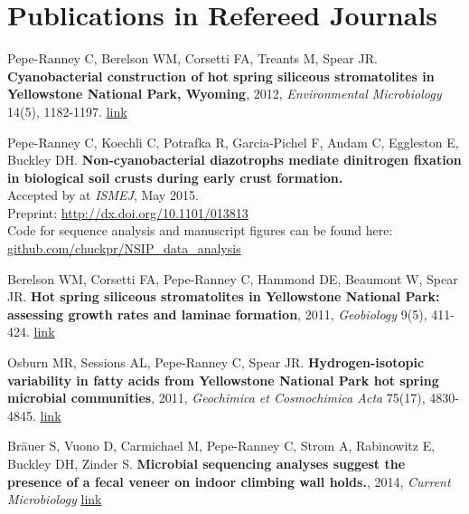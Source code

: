 \documentclass[letterpaper]{article}
\renewenvironment{itemize}{
  \begin{list}{}{
    \setlength{\leftmargin}{1.5em}
  }
}{
  \end{list}
}
\begin{document}
\section*{Publications in Refereed Journals}
\begin{itemize}
\item Pepe-Ranney C, Berelson WM, Corsetti FA, Treants M, Spear JR.
    \textbf{Cyanobacterial construction of hot spring siliceous stromatolites in
    Yellowstone National Park, Wyoming}, 2012, {\it Environmental
    Microbiology} 14(5), 1182-1197. \href{http://www.ncbi.nlm.nih.gov/pubmed/22356555}{link} 
\item Pepe-Ranney C, Koechli C, Potrafka R, Garcia-Pichel F, Andam C, Eggleston E, Buckley DH. 
    \textbf{Non-cyanobacterial diazotrophs mediate dinitrogen fixation in
    biological soil crusts during early crust formation.}\\ 
    Accepted by at \textit{ISMEJ}, May 2015.\\ 
    Preprint: \href{http://dx.doi.org/10.1101/013813}
    {http://dx.doi.org/10.1101/013813}\\
    Code for sequence analysis and manuscript figures can be found here:\\
    \href{http://www.github.com/chuckpr/NSIP_data_analysis}
    {github.com/chuckpr/NSIP\_data\_analysis}
\item Berelson WM, Corsetti FA, Pepe-Ranney C, Hammond DE, Beaumont W, Spear
    JR. \textbf{Hot spring siliceous stromatolites in Yellowstone National Park:
    assessing growth rates and laminae formation}, 2011, {\it Geobiology}
    9(5), 411-424. \href{http://www.ncbi.nlm.nih.gov/pubmed/21777367}{link}
\item Osburn MR, Sessions AL, Pepe-Ranney C, Spear JR. \textbf{Hydrogen-isotopic
    variability in fatty acids from Yellowstone National Park hot spring
    microbial communities}, 2011, {\it Geochimica et Cosmochimica Acta}
    75(17), 4830-4845.
    \href{http://www.sciencedirect.com/science/article/pii/S0016703711003152}{link}
\item Br\"{a}uer S, Vuono D, Carmichael M, Pepe-Ranney C, Strom A, Rabinowitz
    E, Buckley DH, Zinder S. \textbf{Microbial sequencing analyses suggest
    the presence of a fecal veneer on indoor climbing wall holds.}, 2014, {\it
    Current Microbiology} \href{http://www.ncbi.nlm.nih.gov/pubmed/24972665}{link}
\end{itemize}
\end{document}
